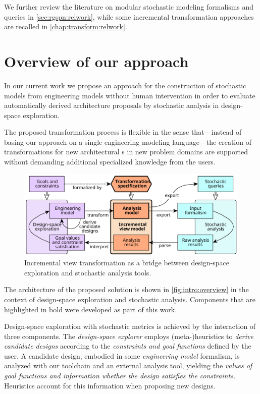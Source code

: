 We further review the literature on modular stochastic modeling formalisms and queries in \vref{sec:rgspn:relwork}, while some incremental transformation approaches are recalled in \vref{chap:transform:relwork}.

\section{Overview of our approach}
\label{sec:intro:approach}

In our current work we propose an approach for the construction of stochastic models from engineering models without human intervention in order to evaluate automatically derived architecture proposals by stochastic analysis in design-space exploration.

The proposed transformation process is flexible in the sense that---instead of basing our approach on a single engineering modeling language---the creation of transformations for new architectural s in new problem domains are supported without demanding additional specialized knowledge from the users.

\begin{figure}
  \centering
  \includegraphics[scale=0.9]{figures/overview}
  \caption{Incremental view transformation as a bridge between design-space exploration and stochastic analysis tools.}
  \label{fig:intro:overview}
\end{figure}

The architecture of the proposed solution is shown in \vref{fig:intro:overview} in the context of design-space exploration and stochastic analysis. Components that are highlighted in bold were developed as part of this work.

Design-space exploration with stochastic metrics is achieved by the interaction of three components. The \emph{design-space explorer} employs (meta-)heuristics to \emph{derive candidate designs} according to the \emph{constraints and goal functions} defined by the user. A candidate design, embodied in some \emph{engineering model} formalism, is analyzed with our toolchain and an external analysis tool, yielding the \emph{values of goal functions and information whether the design satisfies the constraints.} Heuristics account for this information when proposing new designs.

